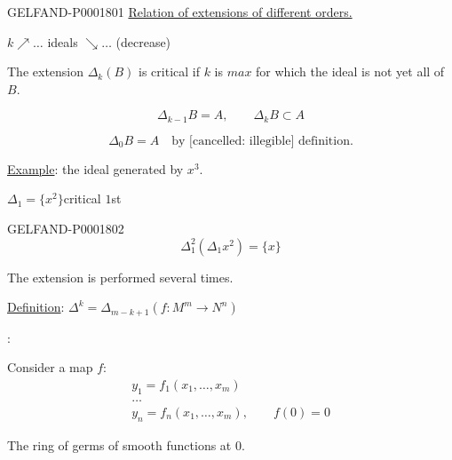 \begin{GelfandAdjacentEvidence}{GELFAND-P000180}{1}
\underline{Relation of extensions of different orders.}

$k\nearrow\ldots$ ideals $\searrow\ldots$ (decrease)

The extension $\Delta_k (B)$ is critical if $k$ is $max$ for which the ideal is not yet all of $B$.

\begin{equation*}\Delta_{k-1}B=A,\qquad\Delta_kB\subset A\end{equation*}

\begin{equation*}\Delta_0B=A\quad\text{by [cancelled: illegible] definition.}\end{equation*}
\end{GelfandAdjacentEvidence}

\underline{Example}: the ideal generated by $x^3$.

\qquad $\Delta_1=\{x^2\}$\qquad critical $1$st

\begin{GelfandAdjacentEvidence}{GELFAND-P000180}{2}
\begin{equation*}\Delta_1^2(\Delta_1x^2)=\{x\}\end{equation*}
\end{GelfandAdjacentEvidence}

The extension is performed several times.

\underline{Definition}: $\Delta^k=\Delta_{m-k+1}$\qquad $(f: M^m\longrightarrow N^n)$

\quad{}:

Consider a map $f$:
\begin{gather*}y_1=f_1(x_1,\ldots, x_m)\\\ldots\\y_n=f_n (x_1,\ldots, x_m),\qquad f (0)=0\end{gather*}

The ring of germs of smooth functions at $0$.

